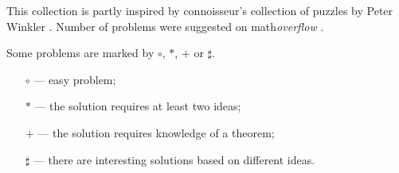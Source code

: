 \documentclass[twoside]{book}
\begin{document}
This collection is partly inspired by connoisseur's collection of puzzles  by Peter Winkler \cite[see][]{winkler}.
Number of problems were suggested on math\textit{overflow} \cite[see][]{One-step}.

\vfill

Some problems are marked by $\circ$, $*$, $+$ or $\sharp$.
\begin{itemize}
\item[$\circ$] --- easy problem;%
\item[$*$] --- the solution requires at least two ideas;%
\item[$+$] --- the solution requires knowledge of a theorem;%
\item[$\sharp$] --- there are interesting solutions based on different ideas.%
\end{itemize}











%
%


\backmatter
\newpage
{}
{\scriptsize

}
\sloppy
\printbibliography[heading=bibintoc]
\fussy
\end{document}
